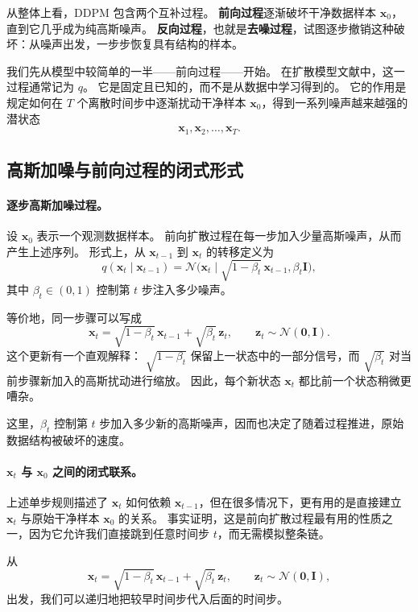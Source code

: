从整体上看，DDPM 包含两个互补过程。
\textbf{前向过程}逐渐破坏干净数据样本 $\mathbf{x}_0$，直到它几乎成为纯高斯噪声。
\textbf{反向过程}，也就是\textbf{去噪过程}，试图逐步撤销这种破坏：从噪声出发，一步步恢复具有结构的样本。

我们先从模型中较简单的一半——前向过程——开始。
在扩散模型文献中，这一过程通常记为 $q$。
它是固定且已知的，而不是从数据中学习得到的。
它的作用是规定如何在 $T$ 个离散时间步中逐渐扰动干净样本 $\mathbf{x}_0$，得到一系列噪声越来越强的潜状态
\[
\mathbf{x}_1,\mathbf{x}_2,\dots,\mathbf{x}_T.
\]

\subsection{高斯加噪与前向过程的闭式形式}

\paragraph{逐步高斯加噪过程。}
设 $\mathbf{x}_0$ 表示一个观测数据样本。
前向扩散过程在每一步加入少量高斯噪声，从而产生上述序列。
形式上，从 $\mathbf{x}_{t-1}$ 到 $\mathbf{x}_t$ 的转移定义为
\[
q(\mathbf{x}_t\mid \mathbf{x}_{t-1})
=
\mathcal{N}\!\bigl(
\mathbf{x}_t \mid
\sqrt{1-\beta_t}\,\mathbf{x}_{t-1},
\beta_t\mathbf{I}
\bigr),
\]
其中 $\beta_t\in(0,1)$ 控制第 $t$ 步注入多少噪声。

等价地，同一步骤可以写成
\[
\mathbf{x}_t
=
\sqrt{1-\beta_t}\,\mathbf{x}_{t-1}
+
\sqrt{\beta_t}\,\mathbf{z}_t,
\qquad
\mathbf{z}_t\sim\mathcal{N}(\mathbf{0},\mathbf{I}).
\]
这个更新有一个直观解释：
$\sqrt{1-\beta_t}$ 保留上一状态中的一部分信号，而
$\sqrt{\beta_t}$ 对当前步骤新加入的高斯扰动进行缩放。
因此，每个新状态 $\mathbf{x}_t$ 都比前一个状态稍微更嘈杂。

这里，$\beta_t$ 控制第 $t$ 步加入多少新的高斯噪声，因而也决定了随着过程推进，原始数据结构被破坏的速度。

\paragraph{$\mathbf{x}_t$ 与 $\mathbf{x}_0$ 之间的闭式联系。}
上述单步规则描述了 $\mathbf{x}_t$ 如何依赖 $\mathbf{x}_{t-1}$，但在很多情况下，更有用的是直接建立 $\mathbf{x}_t$ 与原始干净样本 $\mathbf{x}_0$ 的关系。
事实证明，这是前向扩散过程最有用的性质之一，因为它允许我们直接跳到任意时间步 $t$，而无需模拟整条链。

从
\[
\mathbf{x}_t
=
\sqrt{1-\beta_t}\,\mathbf{x}_{t-1}
+
\sqrt{\beta_t}\,\mathbf{z}_t,
\qquad
\mathbf{z}_t\sim\mathcal{N}(\mathbf{0},\mathbf{I}),
\]
出发，我们可以递归地把较早时间步代入后面的时间步。

